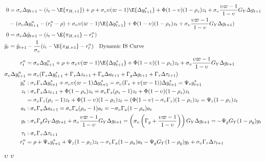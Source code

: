 \begin{align}
    0 &= \sigma_\upsilon \Delta y_{t+1} - (i_t - \E \{ \pi_{H,+1}\}) + \rho + \sigma_\upsilon \upsilon (\varpi - 1)\E \{\Delta y_{t+1}^* \}  + \Phi(1-\upsilon) (1-\rho_z)z_t + \sigma_\upsilon \frac{\upsilon \varpi  - 1}{1-\upsilon} G_Y \Delta g_{t+1} \\
    & - (\sigma_\upsilon \Delta y^n_{t+1} - (r^n_t - \rho) + \sigma_\upsilon \upsilon (\varpi - 1)\E \{\Delta y_{t+1}^* \}  + \Phi (1-\upsilon)(1-\rho_z)z_t + \sigma_\upsilon \frac{\upsilon \varpi  - 1}{1-\upsilon} G_Y \Delta g_{t+1})\\
    0 &= \sigma_\upsilon \Delta \tilde{y}_{t+1} - (i_t - \E \{ \pi_{H,+1}\} - r^n_t)\\
    \tilde{y}_t &= \tilde{y}_{t+1} - \frac{1}{\sigma_\upsilon}(i_t - \E \{ \pi_{H,+1}\} - r^n_t) \quad \text{Dynamic IS Curve}\\
\end{align}
\pagebreak
\begin{align}
    r^n_t  &= \sigma_\upsilon \Delta y^n_{t+1} + \rho + \sigma_\upsilon \upsilon (\varpi - 1)\E \{\Delta y_{t+1}^* \}  + \Phi (1-\upsilon)(1-\rho_z)z_t + \sigma_\upsilon \frac{\upsilon \varpi  - 1}{1-\upsilon} G_Y \Delta g_{t+1}\\
    \sigma_\upsilon \Delta y^n_{t+1} &= \sigma_\upsilon(\Gamma_* \Delta y^*_{t+1} + \Gamma_z \Delta z_{t+1} + \Gamma_a \Delta a_{t+1} + \Gamma_g \Delta g_{t+1} + \Gamma_\tau \Delta \tau_{t+1})\\
    y^*_t&: \sigma_\upsilon \Gamma_* \Delta y^*_{t+1} + \sigma_\upsilon \upsilon(\varpi-1)\Delta y^*_{t+1} = \sigma_\upsilon(\Gamma_* + \upsilon(\varpi-1))\Delta y^*_{t+1} = \Psi_* y^*_{t+1}\\
    z_t&: \sigma_\upsilon \Gamma_z \Delta z_{t+1} + \Phi (1-\rho_z)z_t = \sigma_\upsilon \Gamma_z (\rho_z - 1)z_t + \Phi (1-\upsilon)(1-\rho_z)z_t\\
    &= \sigma_\upsilon \Gamma_z (\rho_z - 1)z_t + \Phi (1-\upsilon)(1-\rho_z)z_t = (\Phi (1-\upsilon) - \sigma_\upsilon \Gamma_z)(1-\rho_z)z_t = \Psi_z (1-\rho_z) z_t\\
    a_t&: \sigma_\upsilon \Gamma_a \Delta a_{t+1} = \sigma_\upsilon \Gamma_a (\rho_a - 1)a_t = - \sigma_\upsilon \Gamma_a (1 - \rho_a)a_t\\
    g_t&: \sigma_\upsilon \Gamma_g G_Y \Delta g_{t+1} + \sigma_\upsilon \frac{\upsilon \varpi  - 1}{1-\upsilon} G_Y \Delta g_{t+1} = \left( \sigma_\upsilon \left(\Gamma_g + \frac{\upsilon \varpi  - 1}{1-\upsilon} \right) \right)G_Y \Delta g_{t+1} = -\Psi_g G_Y (1-\rho_g)g_t \\
    \tau_t&: \sigma_\upsilon \Gamma_\tau \Delta \tau_{t+1}\\
    r^n_t  &= \rho + \Psi_* y^*_{t+1} + \Psi_z (1-\rho_z) z_t - \sigma_\upsilon \Gamma_a (1 - \rho_a)a_t -\Psi_g G_Y (1-\rho_g)g_t + \sigma_\upsilon \Gamma_\tau \Delta \tau_{t+1}
\end{align}
$\upsilon$ $v$